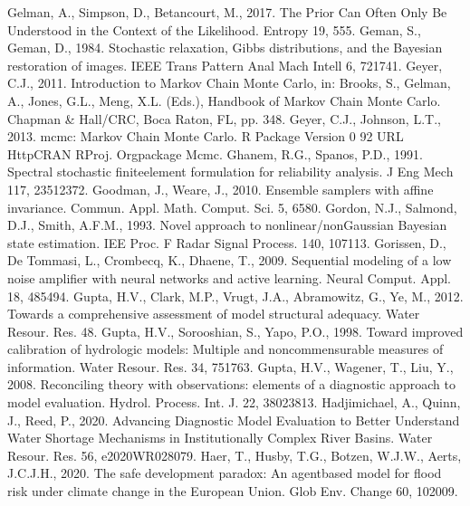 \documentclass[letterpaper,10pt,english]{sphinxmanual}
\begin{document}
Gelman, A., Simpson, D., Betancourt, M., 2017. The Prior Can Often Only Be Understood in the Context of the Likelihood. Entropy 19, 555. 
Geman, S., Geman, D., 1984. Stochastic relaxation, Gibbs distributions, and the Bayesian restoration of images. IEEE Trans Pattern Anal Mach Intell 6, 721\textendash{}741. 
Geyer, C.J., 2011. Introduction to Markov Chain Monte Carlo, in: Brooks, S., Gelman, A., Jones, G.L., Meng, X.\sphinxhyphen{}L. (Eds.), Handbook of Markov Chain Monte Carlo. Chapman \& Hall/CRC, Boca Raton, FL, pp. 3\textendash{}48.
Geyer, C.J., Johnson, L.T., 2013. mcmc: Markov Chain Monte Carlo. R Package Version 0 9\sphinxhyphen{}2 URL HttpCRAN R\sphinxhyphen{}Proj. Orgpackage Mcmc.
Ghanem, R.G., Spanos, P.D., 1991. Spectral stochastic finite\sphinxhyphen{}element formulation for reliability analysis. J Eng Mech 117, 2351\textendash{}2372.
Goodman, J., Weare, J., 2010. Ensemble samplers with affine invariance. Commun. Appl. Math. Comput. Sci. 5, 65\textendash{}80. 
Gordon, N.J., Salmond, D.J., Smith, A.F.M., 1993. Novel approach to nonlinear/non\sphinxhyphen{}Gaussian Bayesian state estimation. IEE Proc. F Radar Signal Process. 140, 107\textendash{}113. 
Gorissen, D., De Tommasi, L., Crombecq, K., Dhaene, T., 2009. Sequential modeling of a low noise amplifier with neural networks and active learning. Neural Comput. Appl. 18, 485\textendash{}494. 
Gupta, H.V., Clark, M.P., Vrugt, J.A., Abramowitz, G., Ye, M., 2012. Towards a comprehensive assessment of model structural adequacy. Water Resour. Res. 48. 
Gupta, H.V., Sorooshian, S., Yapo, P.O., 1998. Toward improved calibration of hydrologic models: Multiple and noncommensurable measures of information. Water Resour. Res. 34, 751\textendash{}763. 
Gupta, H.V., Wagener, T., Liu, Y., 2008. Reconciling theory with observations: elements of a diagnostic approach to model evaluation. Hydrol. Process. Int. J. 22, 3802\textendash{}3813.
Hadjimichael, A., Quinn, J., Reed, P., 2020. Advancing Diagnostic Model Evaluation to Better Understand Water Shortage Mechanisms in Institutionally Complex River Basins. Water Resour. Res. 56, e2020WR028079. 
Haer, T., Husby, T.G., Botzen, W.J.W., Aerts, J.C.J.H., 2020. The safe development paradox: An agent\sphinxhyphen{}based model for flood risk under climate change in the European Union. Glob Env. Change 60, 102009. 
\end{document}
